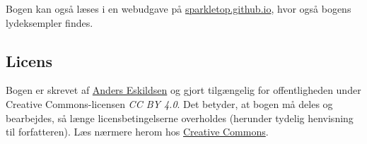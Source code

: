 Bogen kan også læses i en webudgave på \href{https://sparkletop.github.io}{sparkletop.github.io}, hvor også bogens lydeksempler findes.

\subsection{Licens}

Bogen er skrevet af \href{https://vbn.aau.dk/en/persons/146493}{Anders Eskildsen} og gjort tilgængelig for offentligheden under Creative Commons-licensen \textit{CC BY 4.0}. Det betyder, at bogen må deles og bearbejdes, så længe licensbetingelserne overholdes (herunder tydelig henvisning til forfatteren). Læs nærmere herom hos \href{https://creativecommons.org/licenses/by/4.0/}{Creative Commons}.


